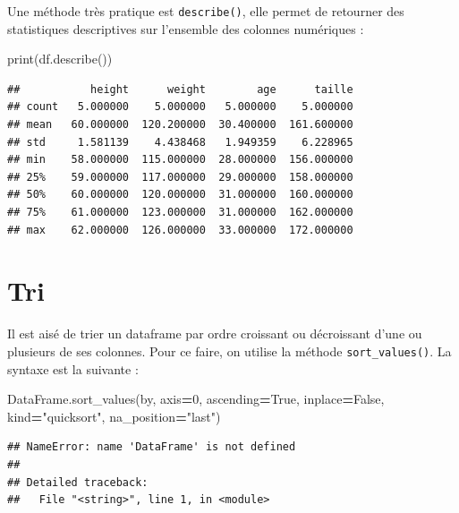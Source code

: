 \documentclass[12pt,]{book}
\newenvironment{Shaded}{\begin{snugshade}}{\end{snugshade}}
\newcommand{\DecValTok}[1]{\textcolor[rgb]{0.00,0.00,0.81}{#1}}
\newcommand{\StringTok}[1]{\textcolor[rgb]{0.31,0.60,0.02}{#1}}
\newcommand{\VariableTok}[1]{\textcolor[rgb]{0.00,0.00,0.00}{#1}}
\newcommand{\OperatorTok}[1]{\textcolor[rgb]{0.81,0.36,0.00}{\textbf{#1}}}
\newcommand{\BuiltInTok}[1]{#1}
\newcommand{\NormalTok}[1]{#1}
\numberwithin{equation}{section}
\numberwithin{countremarque}{section}
\begin{document}
Une méthode très pratique est \texttt{describe()}, elle permet de
retourner des statistiques descriptives sur l'ensemble des colonnes
numériques :

\begin{Shaded}
\begin{Highlighting}[]
\BuiltInTok{print}\NormalTok{(df.describe())}
\end{Highlighting}
\end{Shaded}

\begin{lstlisting}
##           height      weight        age      taille
## count   5.000000    5.000000   5.000000    5.000000
## mean   60.000000  120.200000  30.400000  161.600000
## std     1.581139    4.438468   1.949359    6.228965
## min    58.000000  115.000000  28.000000  156.000000
## 25%    59.000000  117.000000  29.000000  158.000000
## 50%    60.000000  120.000000  31.000000  160.000000
## 75%    61.000000  123.000000  31.000000  162.000000
## max    62.000000  126.000000  33.000000  172.000000
\end{lstlisting}

\section{Tri}\label{tri-2}

Il est aisé de trier un dataframe par ordre croissant ou décroissant
d'une ou plusieurs de ses colonnes. Pour ce faire, on utilise la méthode
\texttt{sort\_values()}. La syntaxe est la suivante :

\begin{Shaded}
\begin{Highlighting}[]
\NormalTok{DataFrame.sort_values(by, axis}\OperatorTok{=}\DecValTok{0}\NormalTok{, ascending}\OperatorTok{=}\VariableTok{True}\NormalTok{,}
\NormalTok{                      inplace}\OperatorTok{=}\VariableTok{False}\NormalTok{, kind}\OperatorTok{=}\StringTok{"quicksort"}\NormalTok{,}
\NormalTok{                      na_position}\OperatorTok{=}\StringTok{"last"}\NormalTok{)}
\end{Highlighting}
\end{Shaded}

\begin{lstlisting}
## NameError: name 'DataFrame' is not defined
## 
## Detailed traceback: 
##   File "<string>", line 1, in <module>
\end{lstlisting}
\end{document}
